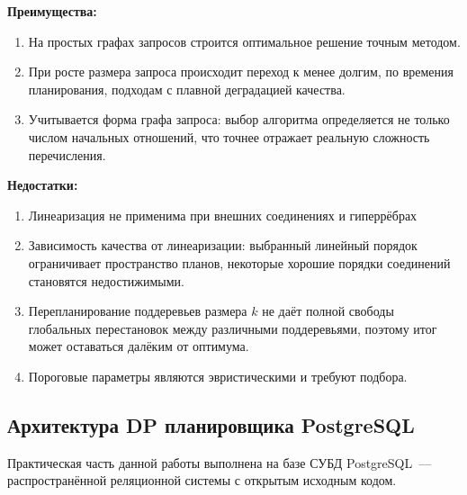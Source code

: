 \textbf{Преимущества:}
\begin{enumerate}
    \item На простых графах запросов строится оптимальное решение точным методом.
    \item При росте размера запроса происходит переход к менее долгим, по времения планирования, подходам с плавной деградацией качества.
    \item Учитывается форма графа запроса: выбор алгоритма определяется не только числом начальных отношений, что точнее отражает реальную сложность перечисления.
\end{enumerate}

\textbf{Недостатки:}
\begin{enumerate}
    \item Линеаризация не применима при внешних соединениях и гиперрёбрах
    \item Зависимость качества от линеаризации: выбранный линейный порядок ограничивает пространство планов, некоторые хорошие порядки соединений становятся недостижимыми.
    \item Перепланирование поддеревьев размера $k$ не даёт полной свободы глобальных перестановок между различными поддеревьями,
    поэтому итог может оставаться далёким от оптимума.
    \item Пороговые параметры являются эвристическими и требуют подбора.
\end{enumerate}


\subsection{Архитектура DP планировщика PostgreSQL}


Практическая часть данной работы выполнена на базе СУБД PostgreSQL~---
распространённой реляционной системы с открытым исходным кодом.
\par

